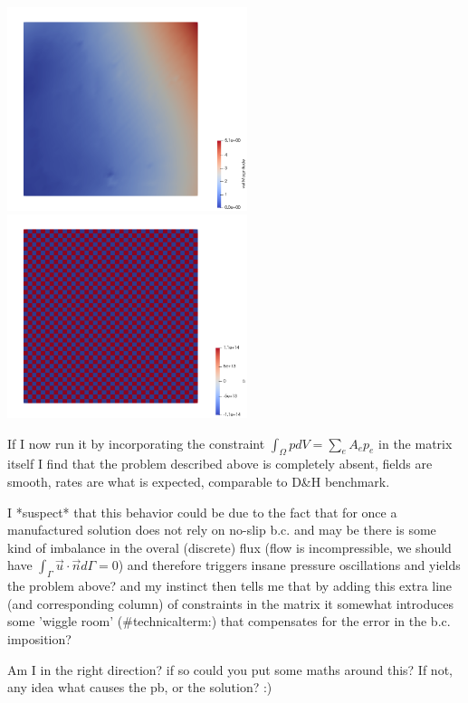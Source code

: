\documentclass[a4paper,12pt]{article}
\begin{document}
\begin{center}
\includegraphics[width=7cm]{../results/exp09/velpb.png}
\includegraphics[width=7cm]{../results/exp09/presspb.png}
\end{center}

If I now run it by incorporating the constraint $\int_\Omega p dV = \sum_e A_e p_e$ in the 
matrix itself I find that the problem described above is completely absent, fields are smooth, 
rates are what is expected, comparable to D\&H benchmark. 

I *suspect* that this behavior could be due to the fact that for once a manufactured solution 
does not rely on no-slip b.c. and may be there is some kind of imbalance in the overal (discrete)
flux (flow is incompressible, we should have $\int_\Gamma \vec{u}\cdot\vec{n}d\Gamma=0$) 
and therefore triggers insane pressure oscillations and 
yields the problem above? and my instinct then tells me that 
by adding this extra line (and corresponding column) of constraints in the matrix it somewhat 
introduces some 'wiggle room' (\#technicalterm:) that compensates for the error in the b.c. imposition?
 
Am I in the right direction? if so could you put some maths around this? 
If not, any idea what causes the pb, or the solution? :)
 
\end{document}
